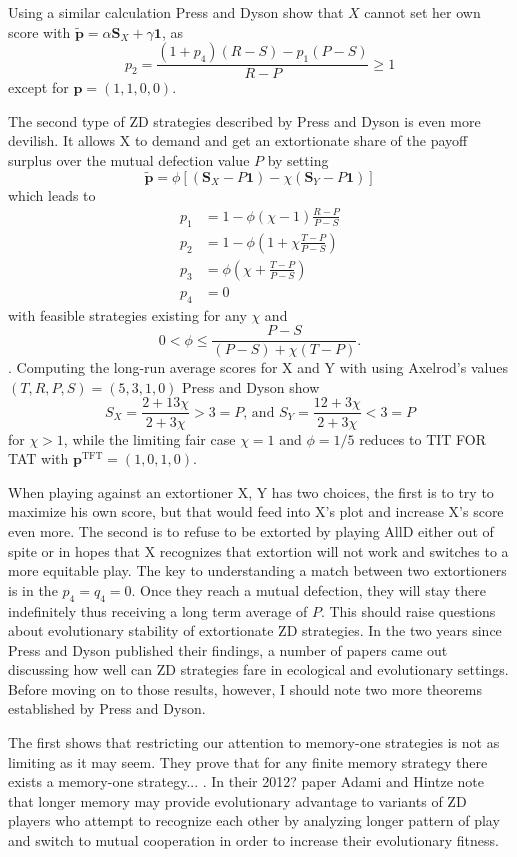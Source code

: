 Using a similar calculation Press and Dyson show that $X$ cannot set her own score with $\tilde{\mathbf{p}} = \alpha \mathbf{S}_X + \gamma \mathbf{1}$, as
\[
p_2 = \frac{(1+p_4)(R-S) - p_1(P-S)}{R-P} \geq 1
\]
except for $\mathbf{p} = (1, 1, 0, 0)$.


The second type of ZD strategies described by Press and Dyson is even more devilish. It allows X to demand and get an extortionate share of the payoff surplus over the mutual defection value $P$ by setting
\[
\tilde{\mathbf{p}} = \phi [(\mathbf{S}_X - P\mathbf{1}) - \chi (\mathbf{S}_Y - P \mathbf{1})]
\]
which leads to
\begin{align*}
p_1 &= 1 - \phi(\chi-1) \frac{R-P}{P-S} \\
p_2 &= 1 - \phi\left(1 + \chi \frac{T-P}{P-S}\right) \\
p_3 &= \phi (\chi + \frac{T-P}{P-S}) \\
p_4 &= 0
\end{align*}
with feasible strategies existing for any $\chi$ and
\[
0 < \phi \leq \frac{P-S}{(P-S) + \chi(T-P)}.
\].
Computing the long-run average scores for X and Y with using Axelrod's values $(T, R, P, S) = (5, 3, 1, 0)$ Press and Dyson show
\[
S_X = \frac{2 + 13\chi}{2 + 3\chi} > 3 = P\textrm{, and } S_Y = \frac{12 + 3\chi}{2 + 3\chi} < 3 = P
\]
for $\chi > 1$, while the limiting fair case $\chi = 1$ and $\phi = 1/5$ reduces to TIT FOR TAT with $\mathbf{p}^\textrm{TFT} = (1, 0, 1, 0)$.

When playing against an extortioner X, Y has two choices, the first is to try to maximize his own score, but that would feed into X's plot and increase X's score even more. The second is to refuse to be extorted by playing AllD either out of spite or in hopes that X recognizes that extortion will not work and switches to a more equitable play. The key to understanding a match between two extortioners is in the $p_4 = q_4 = 0$. Once they reach a mutual defection, they will stay there indefinitely thus receiving a long term average of $P$. This should raise questions about evolutionary stability of extortionate ZD strategies. In the two years since Press and Dyson published their findings, a number of papers came out discussing how well can ZD strategies fare in ecological and evolutionary settings. Before moving on to those results, however, I should note two more theorems established by Press and Dyson.

The first shows that restricting our attention to memory-one strategies is not as limiting as it may seem. They prove that for any finite memory strategy there exists a memory-one strategy... . In their 2012? paper Adami and Hintze \cite{Adami_Hintze_2014} note that longer memory may provide evolutionary advantage to variants of ZD players who attempt to recognize each other by analyzing longer pattern of play and switch to mutual cooperation in order to increase their evolutionary fitness.

